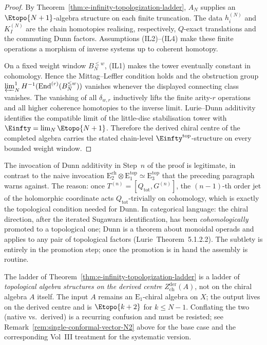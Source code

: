 \begin{proof}
By Theorem~\ref{thm:e-infinity-topologization-ladder}, \(A_N\) supplies
an \(\Etopo{N+1}\)-algebra structure on each finite truncation. The
data \(h_i^{(N)}\) and \(K_I^{(N)}\) are the chain homotopies realising,
respectively, \(Q\)-exact translations and the commuting Dunn factors.
Assumptions \textup{(IL2)}--\textup{(IL4)} make these finite operations
a morphism of inverse systems up to coherent homotopy.

On a fixed weight window \(B_N^{\le w}\), \textup{(IL1)} makes the tower
eventually constant in cohomology. Hence the Mittag--Leffler condition
holds and the obstruction group
\(\varprojlim^1_N H^{-1}(\operatorname{End}^{(r)}(B_N^{\le w}))\)
vanishes whenever the displayed connecting class vanishes. The
vanishing of all \(\delta_{w,r}\) inductively lifts the finite
arity-\(r\) operations and all higher coherence homotopies to the
inverse limit. Lurie--Dunn additivity identifies the compatible limit
of the little-disc stabilisation tower with
\(\Einfty=\lim_N\Etopo{N+1}\). Therefore the derived chiral centre of
the completed algebra carries the stated chain-level
\(\Einfty^{\mathrm{top}}\)-structure on every bounded weight window.
\end{proof}

\begin{remark}
\label{rem:dunn-via-topologization}
The invocation of Dunn additivity in Step~$n$ of the proof is
legitimate, in contrast to the naive invocation
$\mathrm{E}^{\mathrm{ch}}_2 \otimes \mathrm{E}^{\mathrm{top}}_1 \simeq
\mathrm{E}^{\mathrm{top}}_3$ that the preceding paragraph
warns against. The reason: once $T^{(n)} = [Q_{\mathrm{tot}}, G^{(n)}]$,
the $(n-1)$-th order jet of the holomorphic coordinate acts
$Q_{\mathrm{tot}}$-trivially on cohomology, which is exactly the
topological condition needed for Dunn. In categorical language: the
chiral direction, after the iterated Sugawara identification, has been
\emph{cohomologically} promoted to a topological one; Dunn is a
theorem about monoidal operads and applies to any pair of topological
factors (Lurie\,\cite{HA} Theorem~5.1.2.2). The subtlety is entirely
in the promotion step; once the promotion is in hand the assembly is
routine.
\end{remark}

\begin{remark}
\label{rem:native-derived-e-ladder}
The ladder of Theorem~\ref{thm:e-infinity-topologization-ladder} is a
ladder of \emph{topological algebra structures on the derived centre}
$Z^{\mathrm{der}}_{\mathrm{ch}}(A)$, not on the chiral algebra $A$
itself. The input $A$ remains an $\mathrm{E}_1$-chiral algebra on $X$;
the output lives on the derived centre and is $\Etopo{k+2}$ for
$k \le N-1$. Conflating the two (native vs.\ derived) is a
recurring confusion and must be resisted; see
Remark~\ref{rem:single-conformal-vector-N2} above for the base case
and the corresponding Vol~III treatment for the systematic version.
\end{remark}

